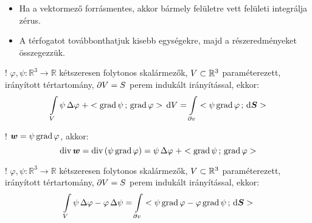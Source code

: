 \documentclass[main.tex]{subfiles}
\begin{document}
\begin{itemize}
  \item Ha a vektormező forrásmentes, akkor bármely
        felületre vett felületi integrálja zérus.

  \item A térfogatot továbbonthatjuk kisebb egységekre,
        majd a részeredményeket összegezzük.
\end{itemize}




! $\varphi, \psi : \mathbb{R}^3 \rightarrow \mathbb{R}$
kétszeresen folytonos skalármezők, ${V} \subset \mathbb{R}^3$
paraméterezett, irányított tértartomány,
$\partial {V} = {S}$
perem indukált irányítással, ekkor:
\begin{equation*}
  \int \limits_{\rvol{V}}
  \psi \, \Delta \varphi \; + \scalar{\grad \psi}{\grad \varphi}
  \, \differential \rvol{V}
  =
  \int \limits_{\partial \rvol{v}}
  \scalar{\psi \grad \varphi}{\differential \vsurf{S}}
\end{equation*}




! $\boldsymbol{w} = \psi \operatorname{grad} \varphi$, akkor:
\begin{equation*}
  \operatorname{div} \boldsymbol{w}
  =
  \operatorname{div} \left(
  \psi \operatorname{grad} \varphi
  \right)
  =
  \psi \, \Delta \varphi \; + < \operatorname{grad} \psi \, ; \, \operatorname{grad} \varphi >
\end{equation*}



! $\varphi, \psi : \mathbb{R}^3 \rightarrow \mathbb{R}$
kétszeresen folytonos skalármezők, ${V} \subset \mathbb{R}^3$
paraméterezett, irányított tértartomány,
$\partial {V} = {S}$
perem indukált irányítással, ekkor:
\begin{equation*}
  \int \limits_{\rvol{V}}
  \psi \, \Delta \varphi - \varphi \, \Delta \psi
  =
  \int \limits_{\partial \rvol{v}}
  \scalar{
    \psi \grad \varphi - \varphi \grad \psi
  }{\differential \vsurf{S}}
\end{equation*}
\end{document}
